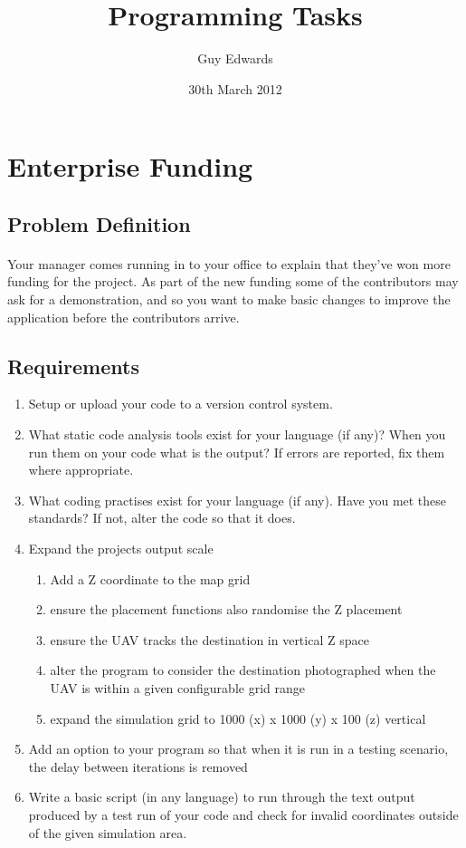 \documentclass[11pt]{book}
\title{\textbf{Programming Tasks}}
\author{Guy Edwards}
\date{30th March 2012}
\begin{document}
\section{Enterprise Funding}

\subsection{Problem Definition}

\paragraph{} Your manager comes running in to your office to explain that
they've won more funding for the project. As part of the new funding some of
the contributors may ask for a demonstration, and so you want to make basic
changes to improve the application before the contributors arrive.

\subsection{Requirements}

\begin{enumerate}
\item Setup or upload your code to a version control system.
\item What static code analysis tools exist for your language (if any)? When you run them on your code what is the output? If errors are reported, fix them where appropriate.
\item What coding practises exist for your language (if any). Have you met these standards? If not, alter the code so that it does.
\item Expand the projects output scale
    \begin{enumerate}
        \item Add a Z coordinate to the map grid
        \item ensure the placement functions also randomise the Z placement
        \item ensure the UAV tracks the destination in vertical Z space
        \item alter the program to consider the destination photographed when the UAV is within a given configurable grid range
        \item expand the simulation grid to 1000 (x) x 1000 (y) x 100 (z) vertical
    \end{enumerate}
\item Add an option to your program so that when it is run in a testing scenario, the delay between iterations is removed
\item Write a basic script (in any language) to run through the text output produced by a test run of your code and check for invalid coordinates outside of the given simulation area.
\end{enumerate}
\end{document}

